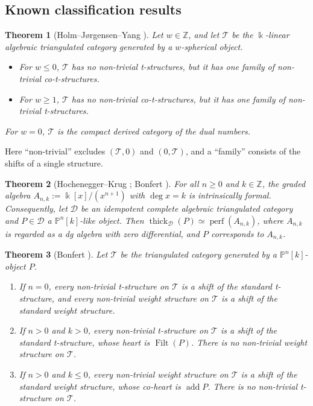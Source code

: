 \documentclass[11pt,reqno]{amsart}
\theoremstyle{plain}
\newtheorem{theorem}{Theorem}[section]
\theoremstyle{definition}
\theoremstyle{remark}
\newcommand{\kk}{\Bbbk}
\DeclareMathOperator{\Filt}{Filt}
\DeclareMathOperator{\add}{add}
\newcommand{\thick}[2][\cD]{\operatorname{thick}_{#1}(#2)}
\newcommand{\Pn}[2]{\mathbb{P}^{#1}[#2]}
\newcommand{\cD}{\mathcal{D}}
\newcommand{\cT}{\mathcal{T}}
\begin{document}
\subsection{Known classification results}

\begin{theorem}[{Holm--J\o rgensen--Yang \cite{HJY13}}]\label{thm:HJY}
Let $w\in\mathbb{Z}$, and let $\cT$ be the $\kk$-linear algebraic triangulated category generated by a $w$-spherical object.
\begin{itemize}
\item For $w\le0$, $\cT$ has no non-trivial t-structures, but it has one family of non-trivial co-t-structures.
\item For $w\ge1$, $\cT$ has no non-trivial co-t-structures, but it has one family of non-trivial t-structures.
\end{itemize}
For $w=0$, $\cT$ is the compact derived category of the dual numbers.
\end{theorem}

Here ``non-trivial'' excludes $(\cT,0)$ and $(0,\cT)$, and a ``family'' consists of the shifts of a single structure.

\begin{theorem}[{Hochenegger--Krug \cite[Lemma~2.8]{HK19}; Bonfert \cite[Props.~2.3 and~2.4]{Bonf26}}]\label{thm:formality}
For all $n\ge0$ and $k\in\mathbb{Z}$, the graded algebra $A_{n,k}:=\kk[x]/(x^{n+1})$ with $\deg x=k$ is intrinsically formal. Consequently, let $\cD$ be an idempotent complete algebraic triangulated category and $P\in\cD$ a $\Pn nk$-like object. Then $\thick P\simeq\operatorname{perf}(A_{n,k})$, where $A_{n,k}$ is regarded as a dg algebra with zero differential, and $P$ corresponds to $A_{n,k}$.
\end{theorem}

\begin{theorem}[{Bonfert \cite[Thm.~3.3]{Bonf26}}]\label{thm:Bonfert}
Let $\cT$ be the triangulated category generated by a $\Pn nk$-object $P$.
\begin{enumerate}
\item If $n=0$, every non-trivial t-structure on $\cT$ is a shift of the standard t-structure, and every non-trivial weight structure on $\cT$ is a shift of the standard weight structure.
\item If $n>0$ and $k>0$, every non-trivial t-structure on $\cT$ is a shift of the standard t-structure, whose heart is $\Filt(P)$. There is no non-trivial weight structure on $\cT$.
\item If $n>0$ and $k\le0$, every non-trivial weight structure on $\cT$ is a shift of the standard weight structure, whose co-heart is $\add P$. There is no non-trivial t-structure on $\cT$.
\end{enumerate}
\end{theorem}
\end{document}
